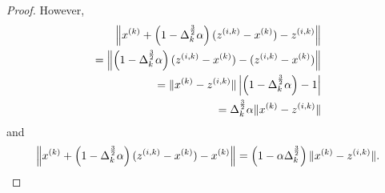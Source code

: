\begin{proof}
However, 
\begin{align*}
\left\|{x^{(k)}} + \left(1 - \Delta_k^{\frac 3 2 }\alpha\right)({z^{(i, k)}} - {x^{(k)}}) - {z^{(i, k)}}\right\| \\
=\left\|\left(1 - \Delta_k^{\frac 3 2 }\alpha\right)({z^{(i, k)}} - {x^{(k)}}) - ({z^{(i, k)}} - {x^{(k)}})\right\| \\
=\|{x^{(k)}} - {z^{(i, k)}}\|\left|\left(1 - \Delta_k^{\frac 3 2 }\alpha\right) - 1\right| \\
=\Delta_k^{\frac 3 2 }\alpha\|{x^{(k)}} - {z^{(i, k)}}\| \\
\end{align*}
and
\begin{align*}
\left\|{x^{(k)}} + \left(1 -  \Delta_k^{\frac 3 2 }\alpha\right)({z^{(i, k)}} - {x^{(k)}}) - {x^{(k)}}\right\| = \left(1 - \alpha\Delta_k^{\frac 3 2 }\right)\|{x^{(k)}} - {z^{(i, k)}}\|.\\
\end{align*}




\color{black}




\end{proof}
